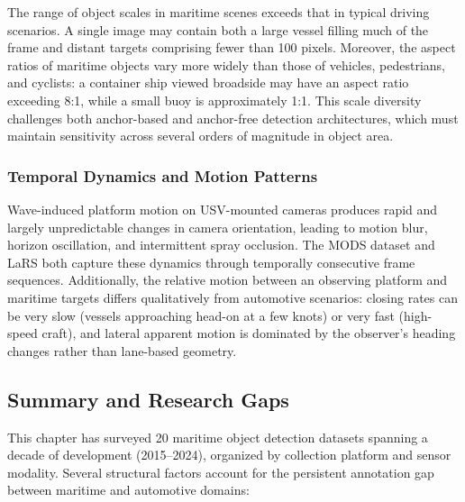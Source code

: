The range of object scales in maritime scenes exceeds that in typical driving scenarios.
A single image may contain both a large vessel filling much of the frame and distant
targets comprising fewer than 100 pixels. Moreover, the aspect ratios of maritime
objects vary more widely than those of vehicles, pedestrians, and cyclists: a container
ship viewed broadside may have an aspect ratio exceeding 8:1, while a small buoy is
approximately 1:1. This scale diversity challenges both anchor-based and anchor-free
detection architectures, which must maintain sensitivity across several orders of
magnitude in object area.

\subsubsection{Temporal Dynamics and Motion Patterns}

Wave-induced platform motion on USV-mounted cameras produces rapid and largely
unpredictable changes in camera orientation, leading to motion blur, horizon
oscillation, and intermittent spray occlusion. The MODS dataset \cite{Bovcon2022MODS}
and LaRS \cite{Zust2023LaRS} both capture these dynamics through temporally consecutive
frame sequences. Additionally, the relative motion between an observing platform and
maritime targets differs qualitatively from automotive scenarios: closing rates can be
very slow (vessels approaching head-on at a few knots) or very fast (high-speed craft),
and lateral apparent motion is dominated by the observer's heading changes rather than
lane-based geometry.

\subsection{Summary and Research Gaps}
\label{subsec:ch1_summary}

This chapter has surveyed 20 maritime object detection datasets spanning a decade of
development (2015--2024), organized by collection platform and sensor modality. Several
structural factors account for the persistent annotation gap between maritime and
automotive domains:

